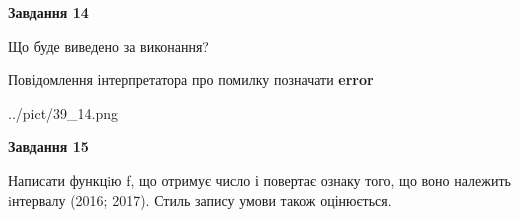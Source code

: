 \documentclass[11pt, ukrainian]{article}
\begin{document}
{\begin {large}
{\begin {center}\textbf{Завдання 14}\end {center}}\par
Що буде виведено за виконання? \par
Повідомлення інтерпретатора про помилку позначати \textbf{error}

\begin{center}
	{../pict/39_14.png}
\end{center}
\newpage

{\begin {center}\textbf{Завдання 15}\end {center}}\par

Написати функцiю f, що отримує число і повертає ознаку того, що воно належить iнтервалу (2016; 2017). Стиль запису умови також оцінюється.\par
\newpage

\end {large}}
\end{document}
